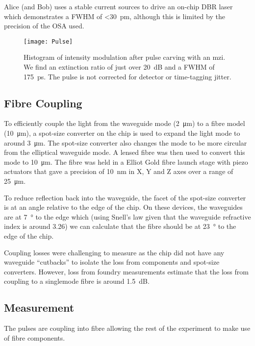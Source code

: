 Alice (and Bob) uses a stable current sources to drive an on-chip \ac{DBR} laser which demonstrates a \ac{FWHM} of \SI{<30}{pm}, although this is limited by the precision of the \ac{OSA} used.

\begin{figure}[tbp]
	\centering
	\texttt{[image: Pulse]}
	\caption[On-chip intensity modulation of coherent states]{Histogram of intensity modulation after pulse carving with an \ac{mzi}. We find an extinction ratio of just over \SI{20}{dB} and a \ac{FWHM} of \SI{175}{\ps}. The pulse is not corrected for detector or time-tagging jitter.}
	\label{fig:pulses}
\end{figure}

\subsection{Fibre Coupling}

To efficiently couple the light from the waveguide mode (\SI{2}{\micro\metre}) to a fibre model (\SI{10}{\micro\metre}), a spot-size converter on the chip is used to expand the light mode to around \SI{3}{\micro\meter}. The spot-size converter also changes the mode to be more circular from the elliptical waveguide mode. A lensed fibre was then used to convert this mode to \SI{10}{\micro\meter}. The fibre was held in a Elliot Gold fibre launch stage with piezo actuators that gave a precision of \SI{10}{\nm} in X, Y and Z axes over a range of \SI{25}{\micro\meter}.

To reduce reflection back into the waveguide, the facet of the spot-size converter is at an angle relative to the edge of the chip. On these devices, the waveguides are at \SI{7}{\degree} to the edge which (using Snell's law given that the waveguide refractive index is around 3.26) we can calculate that the fibre should be at \SI{23}{\degree} to the edge of the chip.

Coupling losses were challenging to measure as the chip did not have any waveguide ``cutbacks'' to isolate the loss from components and spot-size converters.  However, loss from foundry measurements estimate that the loss from coupling to a singlemode fibre is around \SI{1.5}{dB}.

\subsection{Measurement}

The pulses are coupling into fibre allowing the rest of the experiment to make use of fibre components. 

